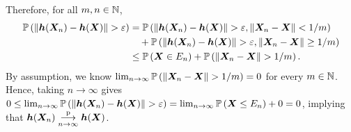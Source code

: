 \begin{enumerate}
\begin{pf}
\begin{enumerate}
\begin{enumerate}
Therefore, for all \(m,n\in\mathbb{N}\),
\begin{align*}
\prob{\|\vect{h}(\vect{X}_n)-\vect{h}(\vect{X})\|>\varepsilon}
&=\prob{\|\vect{h}(\vect{X}_n)-\vect{h}(\vect{X})\|>\varepsilon, \|\vect{X}_n-\vect{X}\|<1/m} \\
&\quad+\prob{\|\vect{h}(\vect{X}_n)-\vect{h}(\vect{X})\|>\varepsilon,
\|\vect{X}_n-\vect{X}\|\ge 1/m} \\
&\le\prob{\vect{X}\in E_n}+\prob{\|\vect{X}_n-\vect{X}\|>1/m}.
\end{align*}
By assumption, we know
\(\lim_{n\to\infty}\prob{\|\vect{X}_n-\vect{X}\|>1/m}=0\) for every \(m\in\mathbb{N}\).
Hence, taking \(n\to\infty\) gives
\(0\le \lim_{n\to\infty}\prob{\|\vect{h}(\vect{X}_n)-\vect{h}(\vect{X})\|>\varepsilon}
=\lim_{n\to\infty}\prob{\vect{X}\le E_n}+0
=0\), implying that \(\bm{h}(\bm{X}_n)\underset{n\to\infty}{\overset{\text{p}}{\longrightarrow}}\bm{h}(\bm{X})\).
\end{enumerate}
\end{enumerate}
\end{pf}
\end{enumerate}

